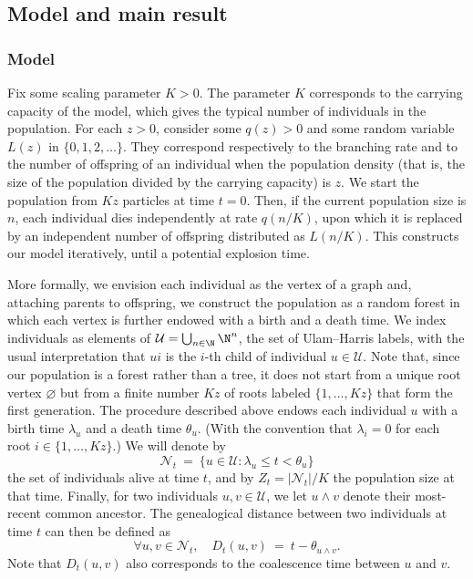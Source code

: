 \begin{refsegment}
\subsection{Model and main result}\label{sec:ch3_model}

\subsubsection*{Model} 
Fix some scaling parameter $K > 0$. The parameter $K$
corresponds to the carrying capacity of the model, which gives the
typical number of individuals in the population. For each $z > 0$,
consider some $q(z) > 0$ and some random variable $L(z)$ in
$\{0, 1, 2, \ldots\}$. They correspond respectively to the branching rate
and to the number of offspring of an individual when the population
density (that is, the size of the population divided by the carrying
capacity) is $z$. We start the population from $Kz$ particles at time
$t=0$. Then, if the current population size is $n$, each individual dies
independently at rate $q(n/K)$, upon which it is replaced by an
independent number of offspring distributed as $L(n/K)$. This constructs
our model iteratively, until a potential explosion time.

More formally, we envision each individual as the vertex of a graph and,
attaching parents to offspring, we construct the population as a random 
 forest in which each vertex is further endowed with a birth and a death time.
We index individuals as elements of 
 $\mathcal{U}=\bigcup_{n\in\N}\N^n$, the set of Ulam--Harris labels, with the usual
interpretation that $ui$ is the $i$-th child of individual $u \in
\mathcal{U}$. Note that, since our population is a forest rather than a
tree, it does not start from a unique root vertex $\varnothing$ but from
a finite number $Kz$ of roots labeled $\{1,\ldots, Kz\}$ that form the
first generation. The procedure described above endows each individual
$u$ with a birth time $\lambda_u$ and a death time $\theta_u$. (With the
convention that $\lambda_i = 0$ for each root $i \in \{1,\ldots, Kz\}$.)
We will denote by 
\[
    \mathcal{N}_t\ =\ \{ u \in \mathcal{U} : \lambda_u \leqslant t < \theta_u \}
\]
the set of individuals alive at time $t$, and by $Z_t =
|\mathcal{N}_t|/K$ the population size at that time. Finally, for two
individuals $u, v \in \mathcal{U}$, we let $u \wedge v$ denote their
most-recent common ancestor. The genealogical distance between two
individuals at time $t$ can then be defined as
\begin{equation*}
    \forall u, v \in \mathcal{N}_t,\quad D_t(u,v)\ =\ t - \theta_{u \wedge
    v}.
\end{equation*}
Note that $D_t(u,v)$ also corresponds to the coalescence time between $u$
and $v$.

\end{refsegment}
